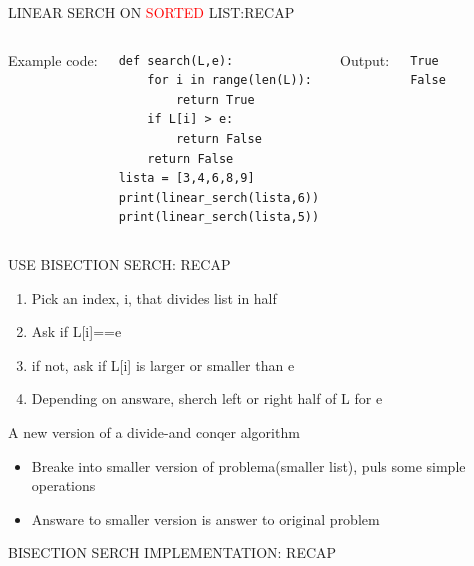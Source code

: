 \documentclass[aspectratio=169]{beamer}
\begin{document}
\begin{frame}[fragile]{LINEAR SERCH ON \textcolor{red}{SORTED} LIST:RECAP}
\begin{columns}
Example code:
\begin{lstlisting}
def search(L,e):
	for i in range(len(L)):
		return True
	if L[i] > e:
		return False
	return False
lista = [3,4,6,8,9]
print(linear_serch(lista,6))
print(linear_serch(lista,5))
\end{lstlisting}
Output:
\begin{block}{}
\begin{verbatim}
True
False
\end{verbatim}
\end{block}
\end{columns}
\end{frame}

\begin{frame}{USE BISECTION SERCH: RECAP}
\begin{enumerate}
\item Pick an index, i, that divides list in half
\item Ask if L[i]==e
\item if not, ask if L[i] is larger or smaller than e
\item Depending on answare, sherch left or right half of L for e
\end{enumerate}

A new version of a divide-and conqer algorithm
\begin{itemize}
\item Breake into smaller version of problema(smaller list), puls some simple operations
\item Answare to smaller version is answer to original problem
\end{itemize}
\end{frame}

\begin{frame}{BISECTION SERCH IMPLEMENTATION: RECAP}

\end{frame}
\end{document}
